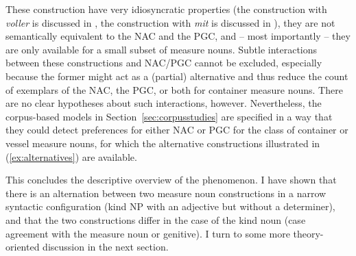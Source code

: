 \documentclass[USenglish]{article}
\begin{document}
\begin{exe}
  \ex\label{ex:alternatives}
  \begin{xlist}
  \end{xlist}
\end{exe}

These construction have very idiosyncratic properties (the construction with \textit{voller} is discussed in \citealp{Zeldes2018}, the construction with \textit{mit} is discussed in \citealp{Bhatt1990}), they are not semantically equivalent to the NAC and the PGC, and -- most importantly -- they are only available for a small subset of measure nouns.
Subtle interactions between these constructions and NAC\slash PGC cannot be excluded, especially because the former might act as a (partial) alternative and thus reduce the count of exemplars of the NAC, the PGC, or both for container measure nouns.
There are no clear hypotheses about such interactions, however.
Nevertheless, the corpus-based models in Section~\ref{sec:corpusstudies} are specified in a way that they could detect preferences for either NAC or PGC for the class of container or vessel measure nouns, for which the alternative constructions illustrated in (\ref{ex:alternatives}) are available.

This concludes the descriptive overview of the phenomenon.
I have shown that there is an alternation between two measure noun constructions in a narrow syntactic configuration (kind NP with an adjective but without a determiner), and that the two constructions differ in the case of the kind noun (case agreement with the measure noun or genitive).
I turn to some more theory-oriented discussion in the next section.


\end{document}
